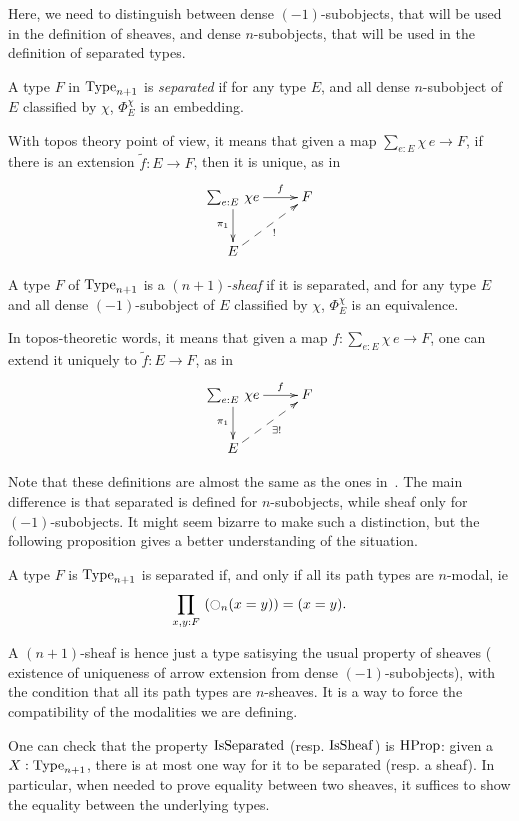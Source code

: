 Here, we need to distinguish between
dense $(-1)$-subobjects, that will be used in the definition of
sheaves, and dense $n$-subobjects, that will be used in the definition
of separated types. 

\begin{defi}
  A type $F$ in $\operatorname{Type}_{n+1}$ is {\em separated} if for any type $E$, and
  all dense $n$-subobject of $E$ classified by $\chi$,
  $\Phi_E^\chi$ is an embedding.
\end{defi}

With topos theory point of view, it means that given a map $\sum_{e:E}
\chi\, e \to F$,
if there is an extension $\tilde f:E\to F$, then it is unique, as in
 \[ \xymatrix{
    \sumD e E {\chi e} \ar[r]^-f \ar[d]_{\pi_1} & F \\
    E \ar@{-->}[ru]_{!}&
  }\]
\begin{defi}
  A type $F$ of $\operatorname{Type}_{n+1}$ is a {\em $(n+1)$-sheaf} if it is
  separated, and for any type $E$ and all dense $(-1)$-subobject of
  $E$ classified by $\chi$, $\Phi_E^\chi$ is an
  equivalence.
\end{defi}

In topos-theoretic words, it means that given a map $f : \sum_{e:E}
\chi\, e\to F$, one can
extend it uniquely to $\tilde f:E \to F$, as in 
 \[ \xymatrix{
    \sumD e E {\chi e} \ar[r]^-f \ar[d]_{\pi_1} & F \\
    E \ar@{-->}[ru]_{\exists !}&
  }\]

Note that these definitions are almost the same as the ones
in~\cite{maclanemoerdijk}. The main difference is that {separated}
is defined for $n$-subobjects, while {sheaf} only for
$(-1)$-subobjects. It might seem bizarre to make such a distinction,
but the following proposition gives a better understanding of the situation.
\begin{prop}
  A type $F$ is $\operatorname{Type}_{n+1}$ is separated if, and only if all its
  path types are $n$-modal, ie
  \[ \prod_{x,y:F}\, \left( \ocircle_n(x=y) \right) = (x=y).\]
\end{prop}

A $(n+1)$-sheaf is hence just a type satisying the usual property of sheaves
(\ie{} existence of uniqueness of arrow extension from dense
$(-1)$-subobjects), with the condition that all its path types are
$n$-sheaves. It is a way to force the compatibility of the modalities we
are defining.

One can check that the property $\operatorname{IsSeparated}$ (resp. $\operatorname{IsSheaf}$) is $\operatorname{HProp}$:
given a $X:\operatorname{Type}_{n+1}$, there is at most one way for it to be separated
(resp. a sheaf). In particular, when needed to prove equality between
two sheaves, it suffices to show the equality between the underlying
types.

